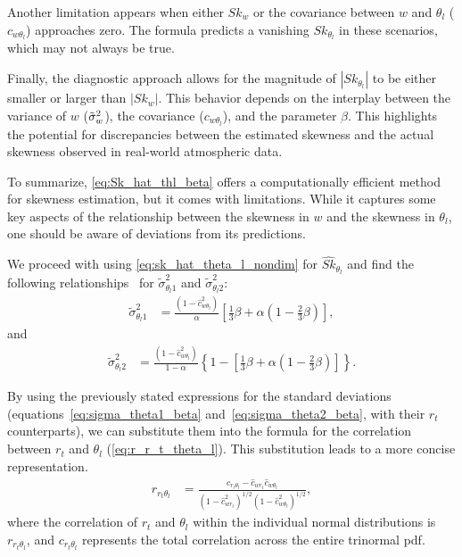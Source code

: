 Another limitation appears when either $Sk_w$
or the covariance between $w$ and $\theta_l$ ($c_{w \theta_l}$) approaches zero.
The formula predicts a vanishing $Sk_{\theta_l}$ in these scenarios,
which may not always be true.

Finally, the diagnostic approach allows for the magnitude of $\left| Sk_{\theta_l} \right|$
to be either smaller or larger than $\left| Sk_w \right|$.
This behavior depends on the interplay between the variance of $w$ (${\tilde{\sigma}_w}^2$),
the covariance ($c_{w \theta_l}$),
and the parameter $\beta$.
This highlights the potential for discrepancies between the estimated skewness
and the actual skewness observed in real-world atmospheric data.

To summarize, \cref{eq:Sk_hat_thl_beta} offers a computationally efficient method for skewness estimation,
but it comes with limitations.
While it captures some key aspects of the relationship between the skewness in $w$
and the skewness in $\theta_l$,
one should be aware of deviations from its predictions.

We proceed with using \cref{eq:sk_hat_theta_l_nondim} for $\widehat{Sk}_{\theta_l}$
and find the following relationships~\cite{larson2005using}
for $\tilde{\sigma}_{\theta_l 1}^2$ and $\tilde{\sigma}_{\theta_l 2}^2$:
\begin{align}
    \label{eq:sigma_theta1_beta}
    \tilde{\sigma}_{\theta_l 1}^2
    &= \frac{\left(1 - \widehat{c}_{w \theta_l}^2\right)}{\alpha} \left[\frac{1}{3} \beta + \alpha \left(1 - \frac{2}{3} \beta\right)\right],
\end{align}
and
\begin{align}
    \label{eq:sigma_theta2_beta}
    \tilde{\sigma}_{\theta_l 2}^2
    &= \frac{\left(1 - \widehat{c}_{w \theta_l}^2\right)} {1 - \alpha} \left\{1 - \left[\frac{1}{3}\beta + \alpha \left(1 - \frac{2}{3} \beta \right)\right]\right\}.
\end{align}

By using the previously stated expressions for the standard deviations
(equations~\eqref{eq:sigma_theta1_beta} and~\eqref{eq:sigma_theta2_beta},
with their $r_t$ counterparts),
we can substitute them into the formula for the correlation between
$r_t$ and $\theta_l$ (\cref{eq:r_r_t_theta_l}).
This substitution leads to a more concise representation.
\begin{align}
    \label{eq:r_r_t_theta_l_beta}
    r_{r_t \theta_l}
    &= \frac{c_{r_t \theta_l} - \widehat{c}_{w r_t} \widehat{c}_{w \theta_l}}
    {\left(1 - \widehat{c}_{w r_t}^2\right)^{1/2} \left(1 - \widehat{c}_{w \theta_l}^2\right)^{1/2}},
\end{align}
where the correlation of $r_t$ and $\theta_l$ within the individual normal distributions is $r_{r_t \theta_l}$,
and $c_{r_t \theta_l}$ represents the total correlation across the entire trinormal \gls{pdf}.

